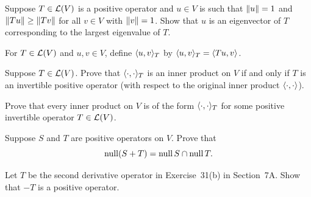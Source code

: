 \begin{exc}
\begin{exercise}
Suppose $T\in\mathcal{L}(V)$ is a positive operator and $u\in V$ is such that
$\lVert u \rVert=1$ and $\lVert Tu \rVert\ge\lVert Tv \rVert$ for all $v\in V$ with $\lVert v \rVert=1$.
Show that $u$ is an eigenvector of $T$ corresponding to the largest eigenvalue
of $T$.
\end{exercise}

\begin{exercise}
For $T\in\mathcal{L}(V)$ and $u,v\in V$, define $\langle u, v \rangle_T$ by
$\langle u, v \rangle_T=\langle Tu, v \rangle$.
\begin{parts}
\item Suppose $T\in\mathcal{L}(V)$. Prove that $\langle \cdot, \cdot \rangle_T$ is an inner
  product on $V$ if and only if $T$ is an invertible positive operator (with
  respect to the original inner product $\langle \cdot, \cdot \rangle$).
\item Prove that every inner product on $V$ is of the form
  $\langle \cdot, \cdot \rangle_T$ for some positive invertible operator $T\in\mathcal{L}(V)$.
\end{parts}
\end{exercise}

\begin{exercise}
Suppose $S$ and $T$ are positive operators on $V$. Prove that
\[ \operatorname{null}(S+T)=\operatorname{null} S\cap\operatorname{null} T. \]
\end{exercise}

\begin{exercise}
Let $T$ be the second derivative operator in Exercise~31(b) in Section~7A. Show
that $-T$ is a positive operator.
\end{exercise}
\end{exc}
